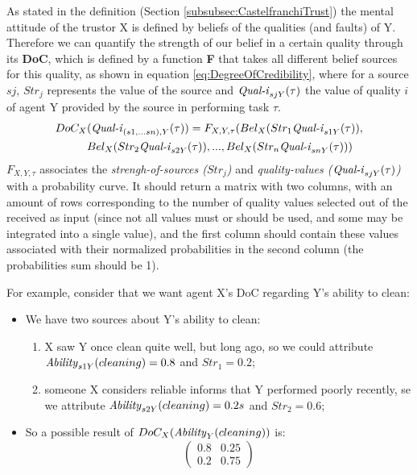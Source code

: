 As stated in the definition (Section \ref{subsubsec:CastelfranchiTrust}) the mental attitude of the trustor X is defined by beliefs of the qualities (and faults) of Y. Therefore we can quantify the strength of our belief in a certain quality through its \textbf{\ac{DoC}}, which is defined by a function \textbf{F} that takes all different belief sources for this quality, as shown in equation \ref{eq:DegreeOfCredibility}, where for a source $sj$, $Str_j$ represents the value of the source and $\text{\textit{Qual-i}}_{sjY}(\tau)$ the value of quality $i$ of agent Y provided by the source in performing task $\tau$. 
\begin{equation}
	\begin {aligned}
	DoC_X&(\text{\textit{Qual-i}}_{(s1, ...sn), Y} (\tau)) = F_{X, Y, \tau} (Bel_X(Str_1 \text{\textit{Qual-i}}_{s1Y}(\tau)), \\
		 &Bel_X(Str_2 \text{\textit{Qual-i}}_{s2Y}(\tau)), ..., Bel_X(Str_n \text{\textit{Qual-i}}_{snY}(\tau))) \\
	\end {aligned}
	\label{eq:DegreeOfCredibility}
\end{equation}
$F_{X, Y, \tau}$ associates the \textit{strengh-of-sources ($Str_j$)} and \textit{quality-values ($\text{\textit{Qual-i}}_{sjY}(\tau)$)} with a probability curve. It should return a matrix with two columns, with an amount of rows corresponding to the number of quality values selected out of the received as input (since not all values must or should be used, and some may be integrated into a single value), and the first column should contain these values associated with their normalized probabilities in the second column (the probabilities sum should be 1). 

For example, consider that we want agent X's \ac{DoC} regarding Y's ability to clean:
\begin{itemize}
	\item We have two sources about Y's ability to clean:
	\begin{enumerate}
		\item X saw Y once clean quite well, but long ago, so we could attribute $\text{\textit{Ability}}_{s1Y}(cleaning) = 0.8$ and $Str_1=0.2$;
		\item someone X considers reliable informs that Y performed poorly recently, se we attribute
		$\text{\textit{Ability}}_{s2Y}(cleaning) = 0.2s$ and $Str_2=0.6$;
	\end{enumerate}
	\item So a possible result of $DoC_X(\text{\textit{Ability}}_Y (cleaning))$ is:
	$$\begin{pmatrix}
		0.8 & 0.25 \\
		0.2 & 0.75
	\end{pmatrix}$$
\end{itemize} 
	

